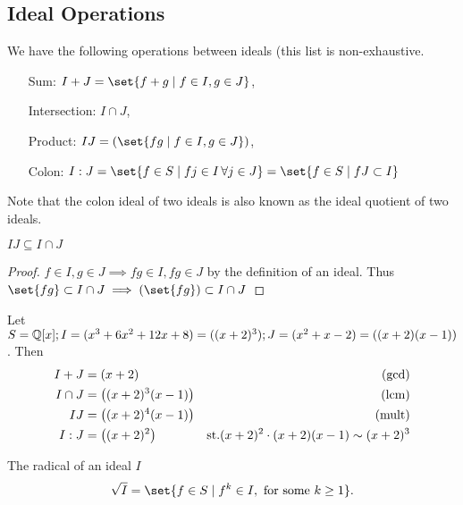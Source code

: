 \subsection{Ideal Operations}
We have the following operations between ideals (this list is non-exhaustive.
\begin{definition}
\phantom{.}
\begin{enumerate}
    \item[Sum: ] $I + J = \set{f + g \mid f \in I , g \in J}$,
    \item[Intersection: ] $I \cap J$,
    \item[Product: ] $IJ = ( \set{f g \mid f \in I , g \in J} )$,
    \item[Colon: ] $I : J = \set{f \in S \mid fj \in I \, \forall j \in J} = \set{f \in S \mid f J \subset I}$
\end{enumerate}
Note that the colon ideal of two ideals is also known as the ideal quotient of two ideals.
\end{definition}

\begin{proposition}
$IJ \subseteq I \cap J$
\end{proposition}

\begin{proof}
$f \in I, g \in J \implies fg \in I, fg \in J $ by the definition of an ideal. Thus $\set{ fg } \subset I \cap J \implies ( \set{ fg } ) \subset I \cap J$
\end{proof}

\begin{example}
Let $S = \mathbb{Q}[x] ; I = (x^3 + 6x^2 + 12x +8) = ( (x+2)^3 ) ; J = (x^2 + x - 2) = ( (x+2) ( x-1) )$. Then
\begin{align*}
    I+J &= (x+2) &(\gcd)\\
    I \cap J &= \left(  (x+2)^3 (x-1)   \right) &(\text{lcm})\\
    IJ &= \left(  (x+2)^4 (x-1) \right) &(\text{mult})\\
    I:J &= \left(  (x+2)^2 \right) &\text{st.} (x+2)^2 \cdot (x+2) (x-1)  \sim (x+2)^3
\end{align*}
\end{example}

\begin{definition}
The radical of an ideal $I$
\begin{align*}
    \sqrt{I} = \set{ f \in S \mid f^k \in I , \text{ for some } k \geq 1}.
\end{align*}
\end{definition}

